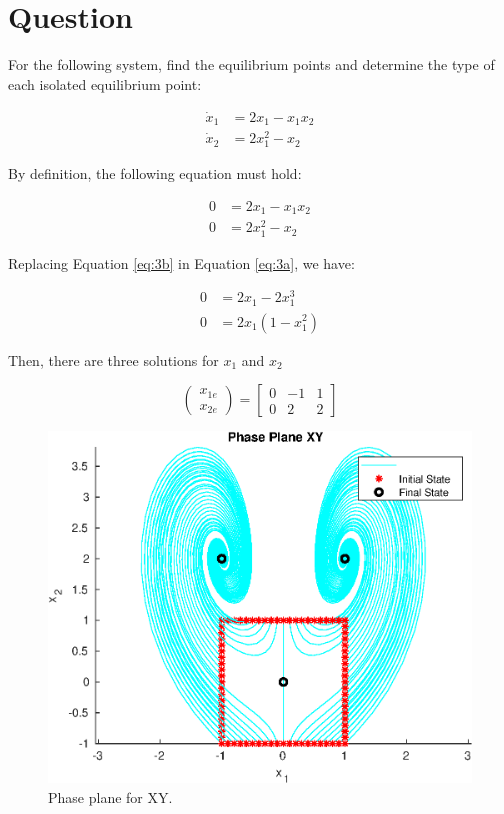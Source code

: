 \documentclass[a4paper,10pt]{article}
\begin{document}
\section{Question}
For the following system, find the equilibrium points and determine the type of each isolated equilibrium point:

\begin{eqnarray*}
\dot{x}_1 &= 2{x}_1 - {x}_1{x}_2 \\
\dot{x}_2 &= 2{x}^2_1 - {x}_2 
\end{eqnarray*}

By definition, the following equation must hold:

\begin{eqnarray}
0 &= 2{x}_1 - {x}_1{x}_2 \label{eq:3a} \\ 
0 &= 2{x}^2_1 - {x}_2   \label{eq:3b}
\end{eqnarray}

Replacing Equation \ref{eq:3b} in Equation \ref{eq:3a}, we have:

\begin{eqnarray*}
0 &= 2{x}_1 - 2{x}^3_1 \\
0 &= 2{x}_1(1 - {x}^2_1)
\end{eqnarray*}

Then, there are three solutions for $x_1$ and $x_2$

\begin{equation}
\begin{pmatrix}
x_{1e}\\x_{2e}
\end{pmatrix}=
\begin{bmatrix}
 0 & -1 & 1 \\
 0 & 2 & 2 
\end{bmatrix}
\end{equation}

\begin{figure}[H]
  \centering
  \includegraphics[width=.8\linewidth]{question3.eps}
  \caption{Phase plane for XY.} \label{fig:q3}
\end{figure}
\end{document}
